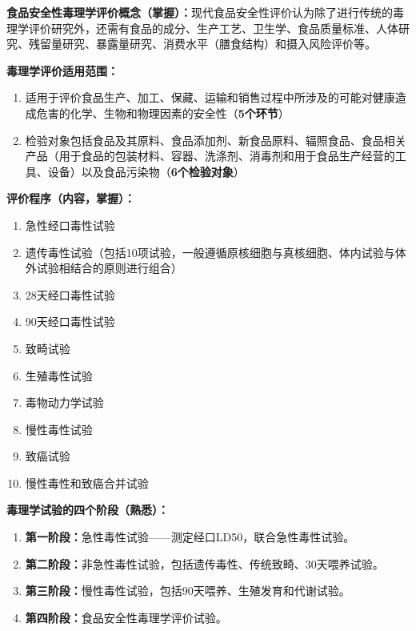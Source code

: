 \begin{keybox}
\textbf{食品安全性毒理学评价概念（掌握）：}现代食品安全性评价认为除了进行传统的毒理学评价研究外，还需有食品的成分、生产工艺、卫生学、食品质量标准、人体研究、残留量研究、暴露量研究、消费水平（膳食结构）和摄入风险评价等。

\textbf{毒理学评价适用范围：}
\begin{enumerate}[leftmargin=*]
    \item 适用于评价食品生产、加工、保藏、运输和销售过程中所涉及的可能对健康造成危害的化学、生物和物理因素的安全性（\textbf{5个环节}）
    \item 检验对象包括食品及其原料、食品添加剂、新食品原料、辐照食品、食品相关产品（用于食品的包装材料、容器、洗涤剂、消毒剂和用于食品生产经营的工具、设备）以及食品污染物（\textbf{6个检验对象}）
\end{enumerate}

\textbf{评价程序（内容，掌握）：}
\begin{enumerate}[leftmargin=*]
    \item 急性经口毒性试验
    \item 遗传毒性试验（包括10项试验，一般遵循原核细胞与真核细胞、体内试验与体外试验相结合的原则进行组合）
    \item 28天经口毒性试验
    \item 90天经口毒性试验
    \item 致畸试验
    \item 生殖毒性试验
    \item 毒物动力学试验
    \item 慢性毒性试验
    \item 致癌试验
    \item 慢性毒性和致癌合并试验
\end{enumerate}
\end{keybox}

\begin{tipbox}
\textbf{毒理学试验的四个阶段（熟悉）：}
\begin{enumerate}[leftmargin=*]
    \item \textbf{第一阶段：}急性毒性试验——测定经口LD50，联合急性毒性试验。
    \item \textbf{第二阶段：}非急性毒性试验，包括遗传毒性、传统致畸、30天喂养试验。
    \item \textbf{第三阶段：}慢性毒性试验，包括90天喂养、生殖发育和代谢试验。
    \item \textbf{第四阶段：}食品安全性毒理学评价试验。
\end{enumerate}
\end{tipbox}

